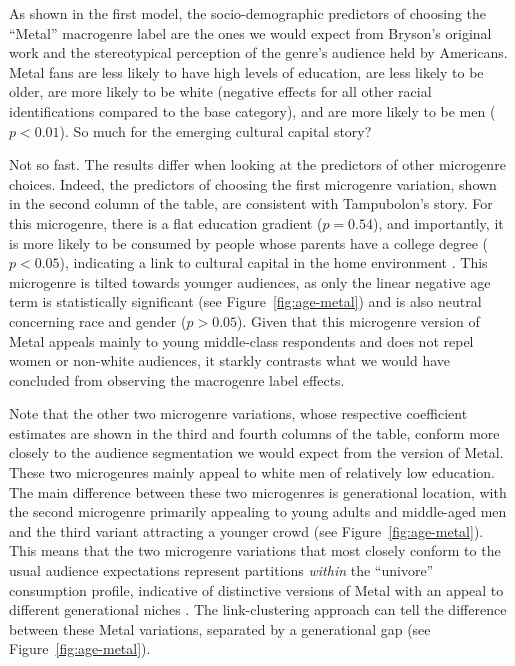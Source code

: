 \documentclass[a4paper,12pt]{article}
\begin{document}
As shown in the first model, the socio-demographic predictors of choosing the ``Metal'' macrogenre label are the ones we would expect from Bryson's original work and the stereotypical perception of the genre's audience held by Americans. Metal fans are less likely to have high levels of education, are less likely to be older, are more likely to be white (negative effects for all other racial identifications compared to the base category), and are more likely to be men ($p<0.01$). So much for the emerging cultural capital story?

Not so fast. The results differ when looking at the predictors of other microgenre choices. Indeed, the predictors of choosing the first microgenre variation, shown in the second column of the table, are consistent with Tampubolon's story. For this microgenre, there is a flat education gradient ($p = 0.54$), and importantly, it is more likely to be consumed by people whose parents have a college degree ($p < 0.05$), indicating a link to cultural capital in the home environment \citep{bourdieu84}. This microgenre is tilted towards younger audiences, as only the linear negative age term is statistically significant (see Figure~\ref{fig:age-metal}) and is also neutral concerning race and gender ($p > 0.05$). Given that this microgenre version of Metal appeals mainly to young middle-class respondents and does not repel women or non-white audiences, it starkly contrasts what we would have concluded from observing the macrogenre label effects. 

Note that the other two microgenre variations, whose respective coefficient estimates are shown in the third and fourth columns of the table, conform more closely to the audience segmentation we would expect from the version of Metal. These two microgenres mainly appeal to white men of relatively low education. The main difference between these two microgenres is generational location, with the second microgenre primarily appealing to young adults and middle-aged men and the third variant attracting a younger crowd (see Figure~\ref{fig:age-metal}). This means that the two microgenre variations that most closely conform to the usual audience expectations represent partitions \textit{within} the ``univore'' consumption profile, indicative of distinctive versions of Metal with an appeal to different generational niches \citep{koch2020evolutionary}. The link-clustering approach can tell the difference between these Metal variations, separated by a generational gap (see Figure~\ref{fig:age-metal}).
\end{document}
